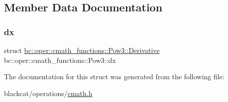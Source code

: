 \subsection{Member Data Documentation}
\mbox{\label{structbc_1_1oper_1_1cmath__functions_1_1Pow3_a03dee12fbde331ad03bd4bc4c8fe1df4}} 
\subsubsection{\texorpdfstring{dx}{dx}}
{\footnotesize\ttfamily struct \hyperlink{structbc_1_1oper_1_1cmath__functions_1_1Pow3_1_1Derivative}{bc\+::oper\+::cmath\+\_\+functions\+::\+Pow3\+::\+Derivative}   bc\+::oper\+::cmath\+\_\+functions\+::\+Pow3\+::dx}



The documentation for this struct was generated from the following file\+:\begin{DoxyCompactItemize}
\item 
blackcat/operations/\hyperlink{cmath_8h}{cmath.\+h}\end{DoxyCompactItemize}
